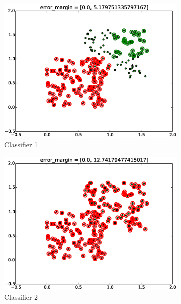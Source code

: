 \documentclass[a4paper,10pt]{article}
\begin{document}
\begin{figure}[ht!]
    \centering
    \begin{subfigure}{.49\textwidth}
    \includegraphics[width=1.00\textwidth]{svm1minError.eps}
    \caption{Classifier 1}
    \end{subfigure}
    \begin{subfigure}{.49\textwidth}
    \includegraphics[width=1.00\textwidth]{svm2minError.eps}
    \caption{Classifier 2}
    \end{subfigure}
    \begin{subfigure}{.49\textwidth}

\end{subfigure}
\end{figure}
\end{document}
